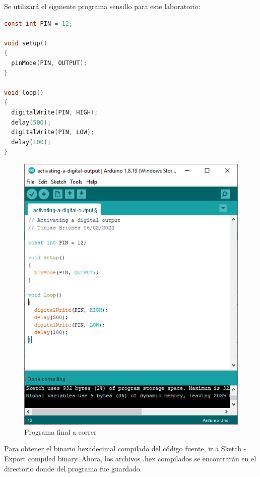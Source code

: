\documentclass{article}
\begin{document}
    \bigbreak

    Se utilizará el siguiente programa sensillo para este laboratorio:

    \begin{lstlisting}[language=C, caption=Programa para activar una salida
    digital]
const int PIN = 12;

void setup()
{
  pinMode(PIN, OUTPUT);
}

void loop()
{
  digitalWrite(PIN, HIGH);
  delay(500);
  digitalWrite(PIN, LOW);
  delay(100);
}
    \end{lstlisting}

    \begin{figure}[H]
        \centering
        \includegraphics[width=0.3\paperwidth]{images/arduino-2}
        \caption{Programa final a correr}
    \end{figure}

    Para obtener el binario hexadecimal compilado del código fuente, ir a
    Sketch - Export compiled binary.
    Ahora, los archivos .hex compilados se encontrarán en el directorio donde
    del programa fue guardado.
\end{document}
